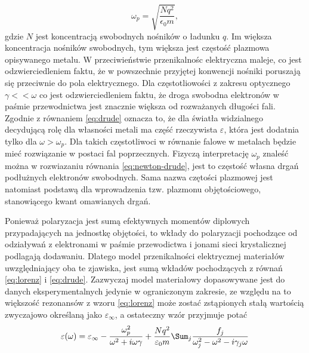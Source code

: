 \begin{equation}
\omega_p = \sqrt{\frac{N q^2}{\epsilon_0 m}},
\label{eq:omega-plazmowa}
\end{equation}
gdzie $N$ jest koncentracją swobodnych nośników o ładunku $q$. Im większa koncentracja nośników swobodnych, tym większa jest częstość plazmowa opisywanego metalu. W przeciwieństwie przenikalnośc elektryczna maleje, co jest odzwierciedleniem faktu, że w powszechnie przyjętej konwencji nośniki poruszają się przeciwnie do pola elektrycznego. Dla częstotliowości z zakresu optycznego $\gamma<<\omega$ co jest odzwierciedleniem faktu, że droga swobodna elektronów w paśmie przewodnictwa jest znacznie większa od rozważanych długości fali. Zgodnie z równaniem  \ref{eq:drude} oznacza to, że dla światła widzialnego decydującą rolę dla własności metali ma część rzeczywista $\varepsilon$, która jest dodatnia tylko dla $\omega>\omega_p$. Dla takich częstotliwoci w równanie falowe w metalach będzie mieć rozwiązanie w postaci fal poprzecznych. Fizyczą interpretację $\omega_p$ znaleść można w rozwiazaniu równania \ref{eq:newton-drude}, jest to częstość własna drgań podłużnych elektronów swobodnych. Sama nazwa czętości plazmowej jest natomiast podstawą dla wprowadzenia tzw. plazmonu objętościowego, stanowiącego kwant omawianych drgań.

Ponieważ polaryzacja jest sumą efektywnych momentów diplowych przypadających na jednostkę objętości, to wkłady do polaryzacji pochodzące od odziaływań z elektronami w paśmie przewodictwa i jonami sieci krystalicznej podlagają dodawaniu. Dlatego model przenikalności elektrycznej materiałów uwzględniający oba te zjawiska, jest sumą wkładów pochodzących z równań \ref{eq:lorenz} i \ref{eq:drude}. Zazwyczaj model materiałowy dopasowywane jest do danych eksperymentalnych jedynie w ograniczonym zakresie, ze względu na to większość rezonansów z wzoru \ref{eq:lorenz} może zostać zstąpionych stałą wartością zwyczajowo określaną jako $\varepsilon_\infty$, a ostateczny wzór przyjmuje potać
\begin{equation}
\varepsilon(\omega)=\varepsilon_\infty- \frac{\omega_p^2}{\omega^2+i\omega\gamma} +\frac{Nq^2}{\varepsilon_0 m} \Sum_j \frac{f_j}{\omega_j^2-\omega^2-i\gamma_j\omega}
\label{eq:lorenz-drude}
\end{equation}
